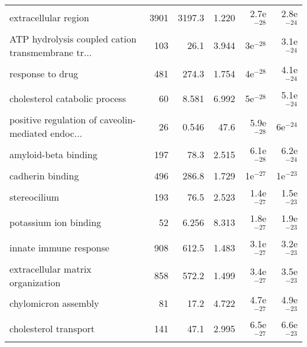 \begin{longtable}{lrrrrr}
                              extracellular region &                    3901 &                  3197.3 &      1.220 &         2.7e$^{-28}$ &         2.8e$^{-24}$ \\
 ATP hydrolysis coupled cation transmembrane tr... &                     103 &                    26.1 &      3.944 &           3e$^{-28}$ &         3.1e$^{-24}$ \\
                                  response to drug &                     481 &                   274.3 &      1.754 &           4e$^{-28}$ &         4.1e$^{-24}$ \\
                     cholesterol catabolic process &                      60 &                   8.581 &      6.992 &           5e$^{-28}$ &         5.1e$^{-24}$ \\
 positive regulation of caveolin-mediated endoc... &                      26 &                   0.546 &       47.6 &         5.9e$^{-28}$ &           6e$^{-24}$ \\
                              amyloid-beta binding &                     197 &                    78.3 &      2.515 &         6.1e$^{-28}$ &         6.2e$^{-24}$ \\
                                  cadherin binding &                     496 &                   286.8 &      1.729 &           1e$^{-27}$ &           1e$^{-23}$ \\
                                      stereocilium &                     193 &                    76.5 &      2.523 &         1.4e$^{-27}$ &         1.5e$^{-23}$ \\
                             potassium ion binding &                      52 &                   6.256 &      8.313 &         1.8e$^{-27}$ &         1.9e$^{-23}$ \\
                            innate immune response &                     908 &                   612.5 &      1.483 &         3.1e$^{-27}$ &         3.2e$^{-23}$ \\
                 extracellular matrix organization &                     858 &                   572.2 &      1.499 &         3.4e$^{-27}$ &         3.5e$^{-23}$ \\
                              chylomicron assembly &                      81 &                    17.2 &      4.722 &         4.7e$^{-27}$ &         4.9e$^{-23}$ \\
                             cholesterol transport &                     141 &                    47.1 &      2.995 &         6.5e$^{-27}$ &         6.6e$^{-23}$ \\

\end{longtable}

